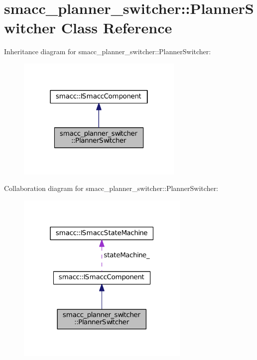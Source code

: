 \hypertarget{classsmacc__planner__switcher_1_1PlannerSwitcher}{}\section{smacc\+\_\+planner\+\_\+switcher\+:\+:Planner\+Switcher Class Reference}
\label{classsmacc__planner__switcher_1_1PlannerSwitcher}


Inheritance diagram for smacc\+\_\+planner\+\_\+switcher\+:\+:Planner\+Switcher\+:
\nopagebreak
\begin{figure}[H]
\begin{center}
\leavevmode
\includegraphics[width=226pt]{classsmacc__planner__switcher_1_1PlannerSwitcher__inherit__graph}
\end{center}
\end{figure}


Collaboration diagram for smacc\+\_\+planner\+\_\+switcher\+:\+:Planner\+Switcher\+:
\nopagebreak
\begin{figure}[H]
\begin{center}
\leavevmode
\includegraphics[width=235pt]{classsmacc__planner__switcher_1_1PlannerSwitcher__coll__graph}
\end{center}
\end{figure}
